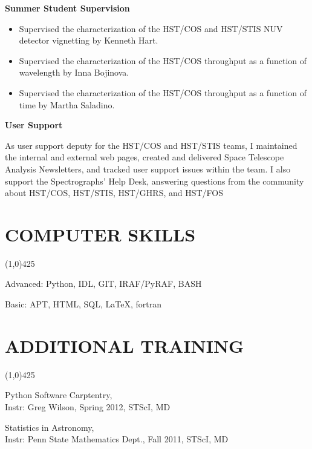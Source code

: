 \documentclass{res}
\begin{document}
\begin{resume}
	{\bf Summer Student Supervision}
		\begin{itemize}
		\item[]  Supervised the characterization of the HST/COS and HST/STIS NUV detector vignetting by Kenneth Hart.
		\item[]  Supervised the characterization of the HST/COS throughput as a function of wavelength by Inna Bojinova.
		\item[]  Supervised the characterization of the HST/COS throughput as a function of time by Martha Saladino.
		\end{itemize}

   {\bf  User Support}
   		\begin{itemize}
		As user support deputy for the HST/COS and HST/STIS teams, I maintained the internal and external web pages, created and delivered Space Telescope Analysis Newsletters, and tracked user support issues within the team. I also support the Spectrographs' Help Desk, answering questions from the community about HST/COS, HST/STIS, HST/GHRS, and HST/FOS
		\end{itemize}
	
	


\section{COMPUTER SKILLS}
\vspace{-.2in}
\begin{center}
\line(1,0){425}
\end{center}
\vspace{-.3in}
\vspace{0.1in}
Advanced: Python, IDL, GIT, IRAF/PyRAF, BASH

Basic: APT, HTML, SQL, LaTeX, fortran
 

\section{ADDITIONAL TRAINING}
\vspace{-.2in} 
\begin{center}
\line(1,0){425}
\end{center}
\vspace{-.24in} 
\vspace{0.1in}

Python Software Carptentry, \\
Instr: Greg Wilson, Spring 2012, STScI, MD

Statistics in Astronomy, \\
Instr: Penn State Mathematics Dept., Fall 2011, STScI, MD


\end{resume}
\end{document}
